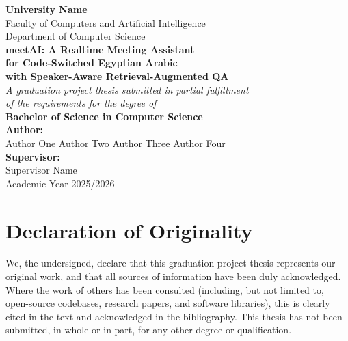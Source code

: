 \documentclass[12pt,a4paper,oneside]{book}
\theoremstyle{plain}
\theoremstyle{definition}
\theoremstyle{remark}
\newcommand{\meetai}{meetAI}
\begin{document}
\frontmatter

\begin{titlepage}
\begin{center}
\vspace*{1.5cm}

{\Large\textbf{University Name}}\\[0.3cm]
{\large Faculty of Computers and Artificial Intelligence}\\[0.2cm]
{\large Department of Computer Science}\\[2.5cm]

{\Huge\bfseries\color{chaptercolor}
\meetai{}: A Realtime Meeting Assistant\\
for Code-Switched Egyptian Arabic\\[0.4cm]
with Speaker-Aware Retrieval-Augmented QA}\\[2cm]

{\Large\textit{A graduation project thesis submitted in partial fulfillment\\
of the requirements for the degree of}}\\[0.8cm]

{\Large\bfseries Bachelor of Science in Computer Science}\\[2cm]

{\large\textbf{Author:}}\\[0.3cm]
{\large Author One \quad Author Two \quad Author Three \quad Author Four}\\[1cm]

{\large\textbf{Supervisor:}}\\[0.3cm]
{\large Supervisor Name}\\[2cm]

{\large Academic Year 2025/2026}

\vfill
\end{center}
\end{titlepage}

\chapter*{Declaration of Originality}

We, the undersigned, declare that this graduation project thesis represents our
original work, and that all sources of information have been duly acknowledged.
Where the work of others has been consulted (including, but not limited to,
open-source codebases, research papers, and software libraries), this is
clearly cited in the text and acknowledged in the bibliography. This thesis
has not been submitted, in whole or in part, for any other degree or
qualification.
\end{document}
